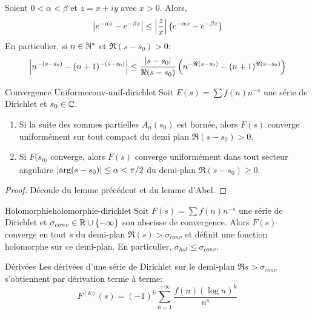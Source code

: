 \documentclass{cours}
\begin{document}
\begin{lemme}
	{}{}
	Soient $ 0 < \alpha < \beta$ et $z = x + i y$ avec $x > 0$. Alors, 
	\begin{equation*}
		\left|e^{-\alpha z} - e^{-\beta z}\right| \leq \left|\frac{z}{x}\right|\left(e^{-\alpha x} - e^{-\beta x}\right)
	\end{equation*}
	En particulier, si $n \in \mathbb{N}^{*}$ et $\Re(s - s_{0}) > 0$: 
	\begin{equation*}
		\left|n^{-(s - s_{0})} - (n + 1)^{-(s - s_{0})}\right| \leq \frac{\left|s - s_{0}\right|}{\Re(s - s_{0})}\left(n^{-\Re(s-s_{0})} - (n + 1)^{\Re(s-s_{0})}\right)
	\end{equation*}
\end{lemme}

\begin{théorème}
	{Convergence Uniforme}{conv-unif-dirichlet}
	Soit $F(s) = \sum f(n)n^{-s}$ une série de Dirichlet et $s_{0} \in \mathbb{C}$. 
	\begin{enumerate}
		\item Si la suite des sommes partielles $A_{n}(s_{0})$ est bornée, alors $F(s)$ converge uniformément sur tout compact du demi plan $\Re(s - s_{0}) > 0$. 
		\item Si $F(s_{0)}$ converge, alors $F(s)$ converge uniformément dans tout secteur angulaire $\left|\arg(s - s_{0})\right| \leq \alpha < \pi/2$ du demi-plan $\Re(s - s_{0}) \geq 0$. 
	\end{enumerate}
\end{théorème}
\begin{proof}
	Découle du lemme précédent et du lemme d'Abel. %
\end{proof}

\begin{corollaire}
	{Holomorphie}{holomorphie-dirichlet}
	Soit $F(s) = \sum f(n) n^{-s}$ une série de Dirichlet et $\sigma_{conv} \in \mathbb{R} \cup \{- \infty\}$ son abscisse de convergence. 
	Alors $F(s)$ converge en tout $s$ du demi-plan $\Re(s) > \sigma_{conv}$ et définit une fonction holomorphe sur ce demi-plan. En particulier, $\sigma_{hol} \leq \sigma_{conv}$. 
\end{corollaire}

\begin{corollaire}
	{Dérivées}{}
	Les dérivées d'une série de Dirichlet sur le demi-plan $\Re s > \sigma_{conv}$ s'obtiennent par dérivation terme à terme: 
	\begin{equation*}
		F^{(k)}(s) = (-1)^{k}\sum_{n = 1}^{+ \infty}\frac{f(n)(\log n)^{k}}{n^{s}}
	\end{equation*}
\end{corollaire}
\end{document}
